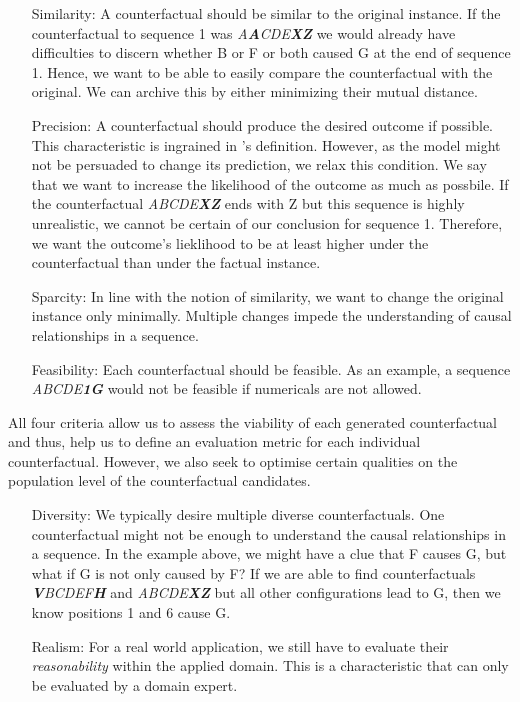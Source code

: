\documentclass[./../../paper.tex]{subfiles}
\begin{document}
\begin{itemize}
    \item[Similarity:] A counterfactual should be similar to the original instance. If the counterfactual to sequence 1 was \textit{A\textbf{A}CDE\textbf{XZ}} we would already have difficulties to discern whether B or F or both caused G at the end of sequence 1. Hence, we want to be able to easily compare the counterfactual with the original. We can archive this by either minimizing their mutual distance.
    \item[Precision:] A counterfactual should produce the desired outcome if possible. This characteristic is ingrained in \citeauthor{molnar2019}'s definition. However, as the model might not be persuaded to change its prediction, we relax this condition. We say that we want to increase the likelihood of the outcome as much as possbile. If the counterfactual \textit{ABCDE\textbf{XZ}} ends with Z but this sequence is highly unrealistic, we cannot be certain of our conclusion for sequence 1. Therefore, we want the outcome's lieklihood to be at least higher under the counterfactual than under the factual instance. 
    \item[Sparcity:] In line with the notion of similarity, we want to change the original instance only minimally. Multiple changes impede the understanding of causal relationships in a sequence. 
    \item[Feasibility:] Each counterfactual should be feasible. As an example, a sequence \textit{ABCDE\textbf{1G}} would not be feasible if numericals are not allowed. 
\end{itemize}

All four criteria allow us to assess the viability of each generated counterfactual and thus, help us to define an evaluation metric for each individual counterfactual. However, we also seek to optimise certain qualities on the population level of the counterfactual candidates.  

\begin{itemize}
    \item[Diversity:] We typically desire multiple diverse counterfactuals. One counterfactual might not be enough to understand the causal relationships in a sequence. In the example above, we might have a clue that F causes G, but what if G is not only caused by F? If we are able to find counterfactuals \textit{\textbf{V}BCDEF\textbf{H}} and \textit{ABCDE\textbf{XZ}} but all other configurations lead to G, then we know positions 1 and 6 cause G. 
    \item[Realism:] For a real world application, we still have to evaluate their \emph{reasonability} within the applied domain. This is a characteristic that can only be evaluated by a domain expert. 
\end{itemize}
\end{document}
